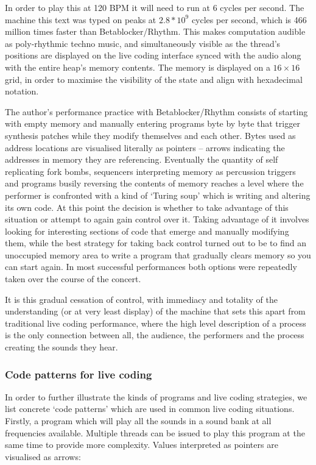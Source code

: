 \documentclass[letterpaper, 12pt]{article}
\begin{document}
In order to play this at 120 BPM it will need to run at 6 cycles per second. The machine this text was typed on peaks at $2.8*10^9$ cycles per second, which is 466 million times faster than Betablocker/Rhythm.
This makes computation audible as poly-rhythmic techno music, and simultaneously visible as the thread's positions are displayed on the live coding interface synced with the audio along with the entire heap's memory contents. The memory is displayed on a $16\times16$ grid, in order to maximise the visibility of the state and align with hexadecimal notation.

The author's performance practice with Betablocker/Rhythm consists of starting with empty memory and manually entering programs byte by byte that trigger synthesis patches while they modify themselves and each other. 
Bytes used as address locations are visualised literally as pointers -- arrows indicating the addresses in memory they are referencing.
Eventually the quantity of self replicating fork bombs, sequencers interpreting memory as percussion triggers and programs busily reversing the contents of memory reaches a level where the performer is confronted with a kind of `Turing soup' which is writing and altering its own code.
At this point the decision is whether to take advantage of this situation or attempt to again gain control over it.
Taking advantage of it involves looking for interesting sections of code that emerge and manually modifying them, while the best strategy for taking back control turned out to be to find an unoccupied memory area to write a program that gradually clears memory so you can start again.
In most successful performances both options were repeatedly taken over the course of the concert.

It is this gradual cessation of control, with immediacy and totality of the understanding (or at very least display) of the machine that sets this apart from traditional live coding performance, where the high level description of a process is the only connection between all, the audience, the performers and the process creating the sounds they hear.
\parskip 18pt

\subsubsection{Code patterns for live coding}
\label{ssub:code_patterns_for_livecoding}

In order to further illustrate the kinds of programs and live coding strategies, we list concrete `code patterns' which are used in common live coding situations.
Firstly, a program which will play all the sounds in a sound bank at all frequencies available.
Multiple threads can be issued to play this program at the same time to provide more complexity.
Values interpreted as pointers are visualised as arrows:
\end{document}
